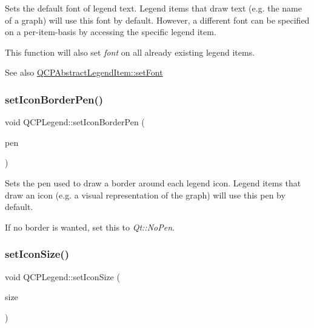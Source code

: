 Sets the default font of legend text. Legend items that draw text (e.\+g. the name of a graph) will use this font by default. However, a different font can be specified on a per-\/item-\/basis by accessing the specific legend item.

This function will also set {\itshape font} on all already existing legend items.

\begin{DoxySeeAlso}{See also}
\mbox{\hyperlink{class_q_c_p_abstract_legend_item_a409c53455d8112f71d70c0c43eb10265}{Q\+C\+P\+Abstract\+Legend\+Item\+::set\+Font}} 
\end{DoxySeeAlso}
\mbox{\label{class_q_c_p_legend_a2f2c93d18a651f4ff294bb3f026f49b8}} 
\subsubsection{\texorpdfstring{setIconBorderPen()}{setIconBorderPen()}}
{\footnotesize\ttfamily void Q\+C\+P\+Legend\+::set\+Icon\+Border\+Pen (\begin{DoxyParamCaption}\item[{const Q\+Pen \&}]{pen }\end{DoxyParamCaption})}

Sets the pen used to draw a border around each legend icon. Legend items that draw an icon (e.\+g. a visual representation of the graph) will use this pen by default.

If no border is wanted, set this to {\itshape Qt\+::\+No\+Pen}. \mbox{\label{class_q_c_p_legend_a8b0740cce488bf7010da6beda6898984}} 
\subsubsection{\texorpdfstring{setIconSize()}{setIconSize()}\hspace{0.1cm}{\footnotesize\ttfamily [1/2]}}
{\footnotesize\ttfamily void Q\+C\+P\+Legend\+::set\+Icon\+Size (\begin{DoxyParamCaption}\item[{const Q\+Size \&}]{size }\end{DoxyParamCaption})}

